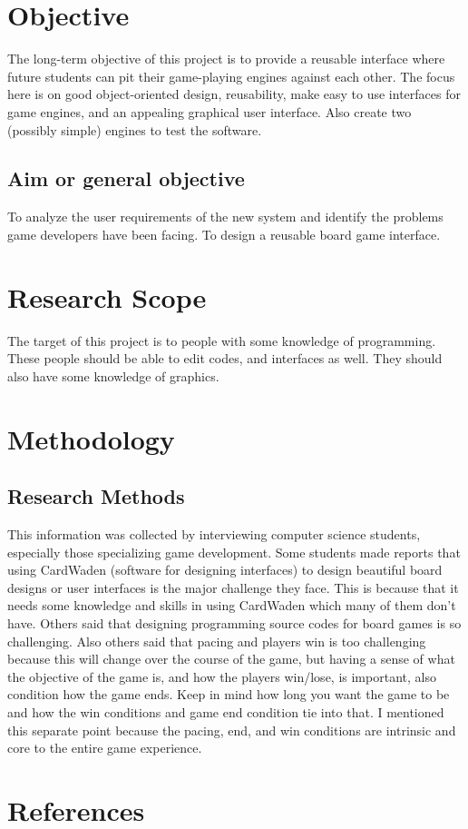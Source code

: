 \documentclass[a4paper,12pt]{article}
\begin{document}
\section{	Objective}
The long-term objective of this project is to provide a reusable interface where future students can pit their game-playing engines against each other. The focus here is on good object-oriented design, reusability, make easy to use interfaces for game engines, and an appealing graphical user interface. Also create two (possibly simple) engines to test the software.


\subsection{Aim or general objective}
To analyze the user requirements of the new system and identify the problems game developers have been facing. 
To design a reusable board game interface. 
\section{Research Scope}
The target of this project is to people with some knowledge of programming. 
These people should be able to edit codes, and interfaces as well. 
They should also have some knowledge of graphics.
	
\section{Methodology}
\subsection{Research Methods}
This information was collected by interviewing computer science students, especially those specializing game development. Some students made reports that using CardWaden (software for designing interfaces) to design beautiful board designs or user interfaces is the major challenge they face. This is because that it needs some knowledge and skills in using CardWaden which many of them don’t have. Others said that designing programming source codes for board games is so challenging.  Also others said that pacing and players win is too challenging because this will change over the course of the game, but having a sense of what the objective of the game is, and how the players win/lose, is important, also condition how the game ends. Keep in mind how long you want the game to be and how the win conditions and game end condition tie into that. I mentioned this separate point because the pacing, end, and win conditions are intrinsic and core to the entire game experience.
\section{References}{
\begin{thebibliography}{1}
\end{thebibliography}
}
\end{document}
